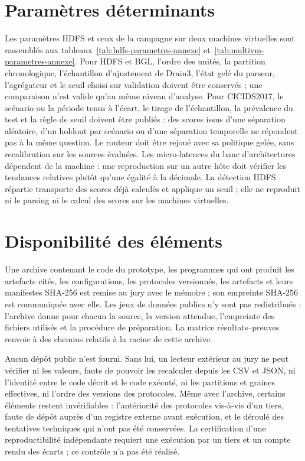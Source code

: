 \section{Paramètres déterminants}

Les paramètres HDFS et ceux de la campagne sur deux machines virtuelles sont rassemblés aux
tableaux~\ref{tab:hdfs-parametres-annexe} et~\ref{tab:multivm-parametres-annexe}. Pour HDFS
et BGL, l'ordre des unités, la partition chronologique, l'échantillon d'ajustement de
Drain3, l'état gelé du parseur, l'agrégateur et le seuil choisi sur validation doivent être
conservés ; une comparaison n'est valide qu'au même niveau d'analyse. Pour CICIDS2017, le
scénario ou la période tenus à l'écart, le tirage de l'échantillon, la prévalence du test et
la règle de seuil doivent être publiés : des scores issus d'une séparation aléatoire, d'un
holdout par scénario ou d'une séparation temporelle ne répondent pas à la même question. Le
routeur doit être rejoué avec sa politique gelée, sans recalibration sur les sources
évaluées. Les micro-latences du banc d'architectures dépendent de la machine : une
reproduction sur un autre hôte doit vérifier les tendances relatives plutôt qu'une égalité à
la décimale. La détection HDFS répartie transporte des scores déjà calculés et applique un
seuil ; elle ne reproduit ni le parsing ni le calcul des scores sur les machines virtuelles.

\section{Disponibilité des éléments}
\label{sec:disponibilite}

Une archive contenant le code du prototype, les programmes qui ont produit les artefacts
cités, les configurations, les protocoles versionnés, les artefacts et leurs manifestes
SHA-256 est remise au jury avec le mémoire ; son empreinte SHA-256 est communiquée avec
elle. Les jeux de données publics n'y sont pas redistribués : l'archive donne pour chacun la
source, la version attendue, l'empreinte des fichiers utilisés et la procédure de
préparation. La matrice résultats--preuves renvoie à des chemins relatifs à la racine de
cette archive.

Aucun dépôt public n'est fourni. Sans lui, un lecteur extérieur au jury ne peut vérifier ni
les valeurs, faute de pouvoir les recalculer depuis les CSV et JSON, ni l'identité entre le
code décrit et le code exécuté, ni les partitions et graines effectives, ni l'ordre des
versions des protocoles. Même avec l'archive, certains éléments restent invérifiables :
l'antériorité des protocoles vis-à-vis d'un tiers, faute de dépôt auprès d'un registre
externe avant exécution, et le déroulé des tentatives techniques qui n'ont pas été
conservées. La certification d'une reproductibilité indépendante requiert une exécution par
un tiers et un compte rendu des écarts ; ce contrôle n'a pas été réalisé.

